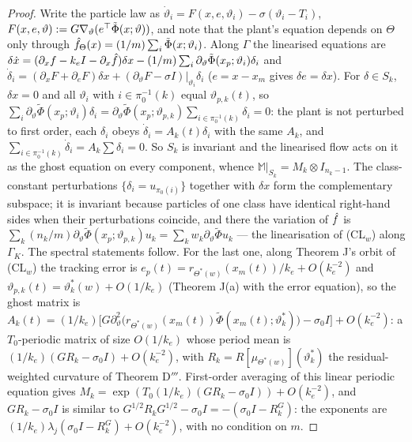 \begin{proof}
Write the particle law as $\dot\vartheta_i = F(x,e,\vartheta_i) - \sigma(\vartheta_i - T_i)$,
$F(x,e,\vartheta) := G\nabla_\vartheta(e^\top\tilde\Phi(x;\vartheta))$, and note that the plant's equation depends on
$\Theta$ only through $\hat f_\Theta(x) = (1/m)\sum_i\tilde\Phi(x;\vartheta_i)$. Along $\Gamma$ the linearised
equations are
$\delta\dot x = (\partial_xf - k_eI - \partial_x\hat f)\delta x
- (1/m)\sum_i\partial_\vartheta\tilde\Phi(x_p;\vartheta_i)\delta_i$ and
$\dot\delta_i = (\partial_xF + \partial_eF)\delta x + (\partial_\vartheta F - \sigma I)|_{\vartheta_i}\delta_i$
($e = x - x_m$ gives $\delta e = \delta x$). For $\delta\in S_k$, $\delta x = 0$ and all $\vartheta_i$ with
$i\in\pi_0^{-1}(k)$ equal $\vartheta_{p,k}(t)$, so
$\sum_i\partial_\vartheta\tilde\Phi(x_p;\vartheta_i)\delta_i
= \partial_\vartheta\tilde\Phi(x_p;\vartheta_{p,k})\sum_{i\in\pi_0^{-1}(k)}\delta_i = 0$: the plant is not
perturbed to first order, each $\delta_i$ obeys $\dot\delta_i = A_k(t)\delta_i$ with the same $A_k$, and
$\sum_{i\in\pi_0^{-1}(k)}\dot\delta_i = A_k\sum\delta_i = 0$. So $S_k$ is invariant and the linearised flow acts on
it as the ghost equation on every component, whence $\mathbb{M}|_{S_k} = M_k\otimes I_{n_k-1}$. The class-constant
perturbations $\{\delta_i = u_{\pi_0(i)}\}$ together with $\delta x$ form the complementary subspace; it is invariant
because particles of one class have identical right-hand sides when their perturbations coincide, and there the
variation of $\hat f$ is $\sum_k(n_k/m)\partial_\vartheta\tilde\Phi(x_p;\vartheta_{p,k})u_k
= \sum_kw_k\partial_\vartheta\tilde\Phi u_k$ --- the linearisation of \textup{(CL$_w$)} along $\Gamma_K$. The
spectral statements follow. For the last one, along Theorem J's orbit of \textup{(CL$_w$)} the tracking error is
$e_p(t) = r_{\Theta^*(w)}(x_m(t))/k_e + O(k_e^{-2})$ and $\vartheta_{p,k}(t) = \vartheta^*_k(w) + O(1/k_e)$ (Theorem
J(a) with the error equation), so the ghost matrix is
$A_k(t) = (1/k_e)\bigl[G\partial^2_\vartheta\bigl(r_{\Theta^*(w)}(x_m(t))\tilde\Phi(x_m(t);\vartheta^*_k)\bigr)
- \sigma_0I\bigr] + O(k_e^{-2})$: a $T_0$-periodic matrix of size $O(1/k_e)$ whose period mean is
$(1/k_e)(GR_k - \sigma_0I) + O(k_e^{-2})$, with $R_k = R[\mu_{\Theta^*(w)}](\vartheta^*_k)$ the residual-weighted
curvature of Theorem D$'''$. First-order averaging of this linear periodic equation gives
$M_k = \exp(T_0(1/k_e)(GR_k - \sigma_0I)) + O(k_e^{-2})$, and $GR_k - \sigma_0I$ is similar to
$G^{1/2}R_kG^{1/2} - \sigma_0I = -(\sigma_0I - R^G_k)$: the exponents are
$(1/k_e)\lambda_j(\sigma_0I - R^G_k) + O(k_e^{-2})$, with no condition on $m$.
\end{proof}
